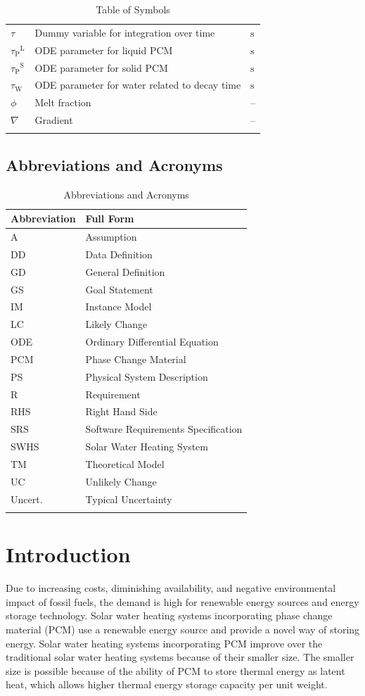 \documentclass[12pt]{article}
\begin{document}
\begin{longtabu}{l X[l] l}
\\
$τ$ & Dummy variable for integration over time & ${\text{s}}$
\\
${{τ_{\text{P}}}^{\text{L}}}$ & ODE parameter for liquid PCM & ${\text{s}}$
\\
${{τ_{\text{P}}}^{\text{S}}}$ & ODE parameter for solid PCM & ${\text{s}}$
\\
${τ_{\text{W}}}$ & ODE parameter for water related to decay time & ${\text{s}}$
\\
$ϕ$ & Melt fraction & --
\\
$∇$ & Gradient & --
\\
\bottomrule
\caption{Table of Symbols}
\label{Table:ToS}
\end{longtabu}
\subsection{Abbreviations and Acronyms}
\label{Sec:TAbbAcc}
\begin{longtable}{l l}
\toprule
\textbf{Abbreviation} & \textbf{Full Form}
\\
\midrule
\endhead
A & Assumption
\\
DD & Data Definition
\\
GD & General Definition
\\
GS & Goal Statement
\\
IM & Instance Model
\\
LC & Likely Change
\\
ODE & Ordinary Differential Equation
\\
PCM & Phase Change Material
\\
PS & Physical System Description
\\
R & Requirement
\\
RHS & Right Hand Side
\\
SRS & Software Requirements Specification
\\
SWHS & Solar Water Heating System
\\
TM & Theoretical Model
\\
UC & Unlikely Change
\\
Uncert. & Typical Uncertainty
\\
\bottomrule
\caption{Abbreviations and Acronyms}
\label{Table:TAbbAcc}
\end{longtable}
\section{Introduction}
\label{Sec:Intro}
Due to increasing costs, diminishing availability, and negative environmental impact of fossil fuels, the demand is high for renewable energy sources and energy storage technology. Solar water heating systems incorporating phase change material (PCM) use a renewable energy source and provide a novel way of storing energy. Solar water heating systems incorporating PCM improve over the traditional solar water heating systems because of their smaller size. The smaller size is possible because of the ability of PCM to store thermal energy as latent heat, which allows higher thermal energy storage capacity per unit weight.
\end{document}
